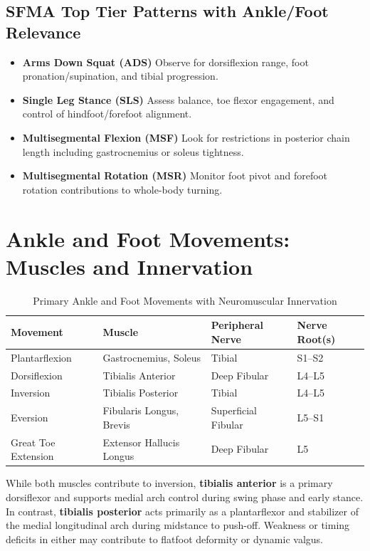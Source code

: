 \subsection*{SFMA Top Tier Patterns with Ankle/Foot Relevance}

\begin{itemize}
  \item \textbf{Arms Down Squat (ADS)} \textendash{} Observe for dorsiflexion range, foot pronation/supination, and tibial progression. 
  \item \textbf{Single Leg Stance (SLS)} \textendash{} Assess balance, toe flexor engagement, and control of hindfoot/forefoot alignment. 
  \item \textbf{Multisegmental Flexion (MSF)} \textendash{} Look for restrictions in posterior chain length including gastrocnemius or soleus tightness. 
  \item \textbf{Multisegmental Rotation (MSR)} \textendash{} Monitor foot pivot and forefoot rotation contributions to whole-body turning.
\end{itemize}

\section*{Ankle and Foot Movements: Muscles and Innervation}

\begin{table}[H]
\centering
\captionsetup{justification=raggedright, singlelinecheck=false}
\begin{tabular}{|p{3.5cm}|p{4.5cm}|p{4cm}|p{2.5cm}|}
\hline
\textbf{Movement} & \textbf{Muscle} & \textbf{Peripheral Nerve} & \textbf{Nerve Root(s)} \\
\hline
Plantarflexion & Gastrocnemius, Soleus & Tibial & S1--S2 \\
\hline
Dorsiflexion & Tibialis Anterior & Deep Fibular & L4--L5 \\
\hline
Inversion & Tibialis Posterior & Tibial & L4--L5 \\
\hline
Eversion & Fibularis Longus, Brevis & Superficial Fibular & L5--S1 \\
\hline
Great Toe Extension & Extensor Hallucis Longus & Deep Fibular & L5 \\
\hline
\end{tabular}
\caption{Primary Ankle and Foot Movements with Neuromuscular Innervation}
\end{table}

\begin{tcolorbox}[colback=gray!5, colframe=black, title={Clinical Insight: Tibialis Anterior vs. Tibialis Posterior}]
While both muscles contribute to inversion, \textbf{tibialis anterior} is a primary dorsiflexor and supports medial arch control during swing phase and early stance. In contrast, \textbf{tibialis posterior} acts primarily as a plantarflexor and stabilizer of the medial longitudinal arch during midstance to push-off. Weakness or timing deficits in either may contribute to flatfoot deformity or dynamic valgus.
\end{tcolorbox}

